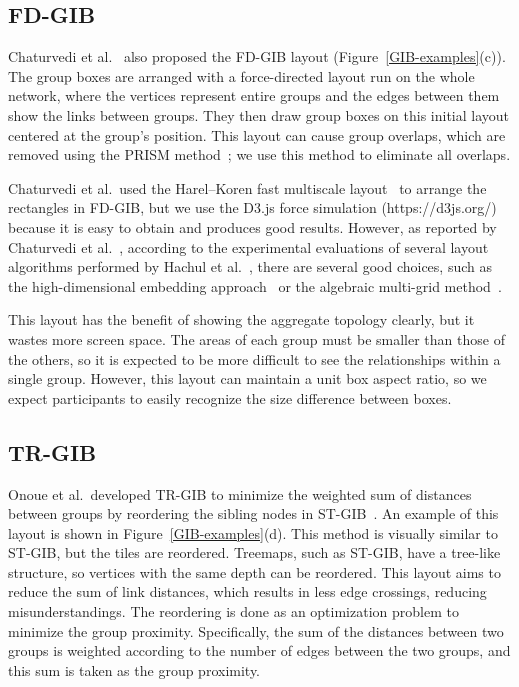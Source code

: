 \documentclass[review]{vgtc}                 %
\begin{document}
\subsection{FD-GIB}
Chaturvedi et al.~\cite{chaturvedi2014group} also proposed the FD-GIB layout (Figure~\ref{GIB-examples}(c)).
The group boxes are arranged with a force-directed layout run on the whole network, where the vertices represent entire groups and the edges between them show the links between groups.
They then draw group boxes on this initial layout centered at the group's position.
This layout can cause group overlaps, which are removed using the PRISM method~\cite{gansner2008efficient}; we use this method to eliminate all overlaps.

Chaturvedi et al.\ used the Harel--Koren fast multiscale layout~\cite{harel2002graph} to arrange the rectangles in FD-GIB, but we use the D3.js force simulation (https://d3js.org/) because it is easy to obtain and produces good results.
However, as reported by Chaturvedi et al.~\cite{chaturvedi2014group}, according to the experimental evaluations of several layout algorithms performed by Hachul et al.~\cite{Hachul:2005:ECF:2102325.2102348,Hachul2007LargeGraphLA}, there are several good choices, such as the high-dimensional embedding approach~\cite{harel2002graph} or the algebraic multi-grid method~\cite{koren2003drawing}.

This layout has the benefit of showing the aggregate topology clearly, but it wastes more screen space.
The areas of each group must be smaller than those of the others, so it is expected to be more difficult to see the relationships within a single group. However, this layout can maintain a unit box aspect ratio, so we expect participants to easily recognize the size difference between boxes.

\subsection{TR-GIB}
Onoue et al.\ developed TR-GIB to minimize the weighted sum of distances between groups by reordering the sibling nodes in ST-GIB~\cite{onoue2017optimal}.
An example of this layout is shown in Figure~\ref{GIB-examples}(d).
This method is visually similar to ST-GIB, but the tiles are reordered.
Treemaps, such as ST-GIB, have a tree-like structure, so vertices with the same depth can be reordered.
This layout aims to reduce the sum of link distances, which results in less edge crossings, reducing misunderstandings.
The reordering is done as an optimization problem to minimize the group proximity.
Specifically, the sum of the distances between two groups is weighted according to the number of edges between the two groups, and this sum is taken as the group proximity.
\end{document}
